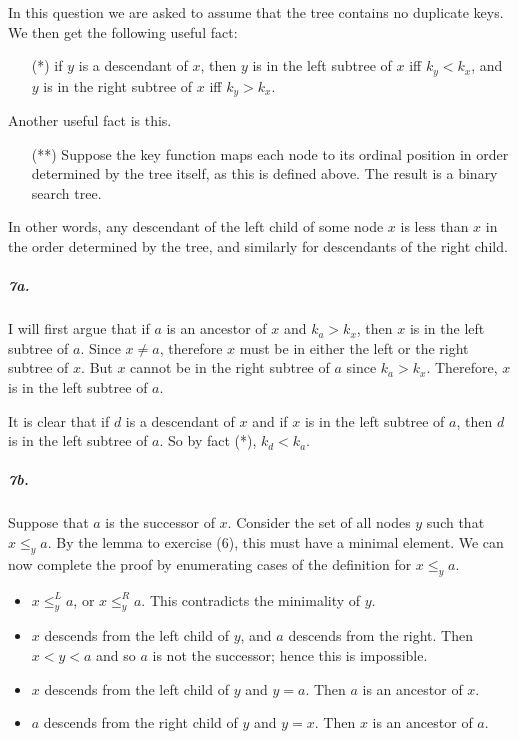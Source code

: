 \documentclass[
]{article}
\begin{document}
In this question we are asked to assume that the tree contains no duplicate keys.  We then get the following useful fact:
\begin{itemize}
\item[(*)] if $y$ is a descendant of $x$, then $y$ is in the left subtree of $x$ iff $k_y<k_x$, and $y$ is in the right subtree of $x$ iff $k_y>k_x$.
\end{itemize}

Another useful fact is this.
\begin{itemize}
\item[(**)] Suppose the key function maps each node to its ordinal position in order determined by the tree itself, as this is defined above.  The result is a binary search tree.
\end{itemize}
In other words, any descendant of the left child of some node $x$ is less than $x$ in the order determined by the tree, and similarly for descendants of the right child. 



\subparagraph{7a.} I will first argue that if $a$ is an ancestor of $x$ and $k_a>k_x$, then $x$ is in the left subtree of $a$.  Since $x\neq a$, therefore $x$ must be in either the left or the right subtree of $x$.  But $x$ cannot be in the right subtree of $a$ since $k_a>k_x$.  Therefore, $x$ is in the left subtree of $a$.  

It is clear that if $d$ is a descendant of $x$ and if $x$ is in the left subtree of $a$, then $d$ is in the left subtree of $a$.  So by fact (*), $k_d<k_a$.

\subparagraph{7b.} 

Suppose that $a$ is the successor of $x$.  Consider the set of all nodes $y$ such that $x\leq_y a$.  By the lemma to exercise (6), this must have a minimal element.  We can now complete the proof by enumerating cases of the definition for $x\leq_y a$.
\begin{itemize}
\item $x\leq_y^L a$, or $x\leq_y^R a$.  This contradicts the minimality of $y$.
\item $x$ descends from the left child of $y$, and $a$ descends from the right.  Then $x<y<a$ and so $a$ is not the successor; hence this is impossible.
\item $x$ descends from the left child of $y$ and $y=a$.  Then $a$ is an ancestor of $x$.
\item $a$ descends from the right child of $y$ and $y=x$.  Then $x$ is an ancestor of $a$.
\end{itemize}
\end{document}
